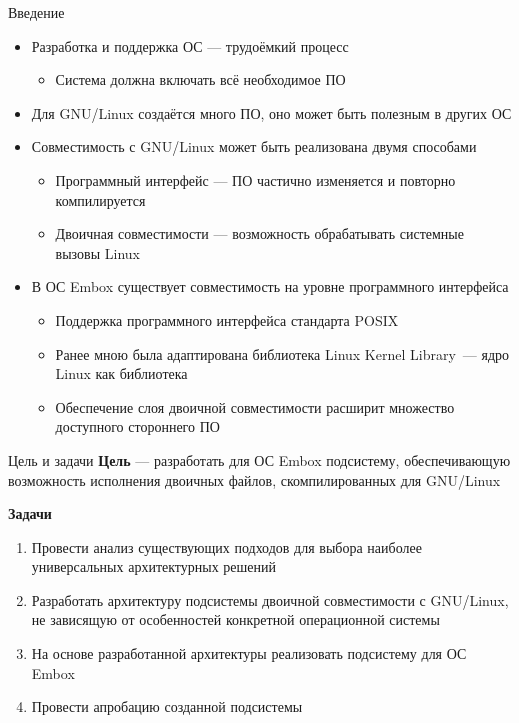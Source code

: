 \documentclass[english,russian,aspectratio=169]{beamer}
\begin{document}
\begin{frame}[t]{Введение}
\begin{itemize}
    \item Разработка и поддержка ОС --- трудоёмкий процесс
    \begin{itemize}
        \item Система должна включать всё необходимое ПО
    \end{itemize}
    \item Для GNU/Linux создаётся много ПО, оно может быть полезным в других ОС
    \item Совместимость с GNU/Linux может быть реализована двумя способами
    \begin{itemize}
        \item Программный интерфейс --- ПО частично изменяется и повторно компилируется
        \item Двоичная совместимости --- возможность обрабатывать системные вызовы Linux
    \end{itemize}
    \item В ОС Embox существует совместимость на уровне программного интерфейса
    \begin{itemize}
        \item Поддержка программного интерфейса стандарта POSIX
        \item Ранее мною была адаптирована библиотека Linux Kernel Library~---\newline
        ядро Linux как библиотека
        \item Обеспечение слоя двоичной совместимости расширит множество доступного\newline
        стороннего ПО
    \end{itemize}
\end{itemize}

\end{frame}

\begin{frame}[t]{Цель и задачи}
\textbf{Цель} --- разработать для ОС Embox подсистему, обеспечивающую возможность\newline
исполнения двоичных файлов, скомпилированных для GNU/Linux

\vspace{8pt}
\textbf{Задачи}
\begin{enumerate}
    \item Провести анализ существующих подходов для выбора наиболее универсальных архитектурных решений
    \item Разработать архитектуру подсистемы двоичной совместимости с GNU/Linux, не зависящую от особенностей конкретной операционной системы
    \item На основе разработанной архитектуры реализовать подсистему для ОС Embox
    \item Провести апробацию созданной подсистемы
\end{enumerate}
\end{frame}
\end{document}

